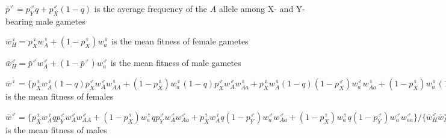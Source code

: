 \documentclass[12pt]{article}
\begin{document}
\begin{threeparttable}[ht]
\begin{tabular}{l}
  \hline \hline 
   \end{tabular}
      \begin{tablenotes}
      \scriptsize
      \item $\bar{p}^{\male}=p_{Y}^{\male}q+p_{X}^{\male}(1-q)$ is the average frequency of the $A$ allele among X- and Y-bearing male gametes 
      \item $\bar{w}_H^\female = p_X^\female w_A^\female + (1-p_X^\female) w_a^\female$ is the mean fitness of female gametes
      \item $\bar{w}_H^\male = \bar{p}^{\male} w_A^\male + (1-\bar{p}^{\male}) w_a^\male$ is the mean fitness of male gametes
       \item $\bar{w}^\female = \{ p_X^\female w_A^\female (1-q) p_X^\male w_A^\male w_{AA}^\female + (1 - p_X^\female) w_a^\female (1-q) p_X^\male w_A^\male w_{Aa}^\female + p_X^\female w_A^\female (1-q) (1 - p_X^\male) w_a^\male w_{Aa}^\female + (1-p_X^\female) w_a^\female (1-q) (1 - p_X^\male) w_a^\male w_{aa}^\female \} / \{ \bar{w}_H^\female \bar{w}_H^\male\}$ is the mean fitness of females
       \item $\bar{w}^\male = \{ p_X^\female w_A^\female q p_Y^\male w_A^\male w_{AA}^\male + (1 - p_X^\female) w_a^\female q p_Y^\male w_A^\male w_{Aa}^\male + p_X^\female w_A^\female q (1 - p_Y^\male) w_a^\male w_{Aa}^\male + (1-p_X^\female) w_a^\female q (1 - p_Y^\male) w_a^\male w_{aa}^\male \} / \{ \bar{w}_H^\male \bar{w}_H^\male\}$ is the mean fitness of males
    \end{tablenotes}
  \label{tab:haplotype_growth}
\end{threeparttable}
\end{document}
